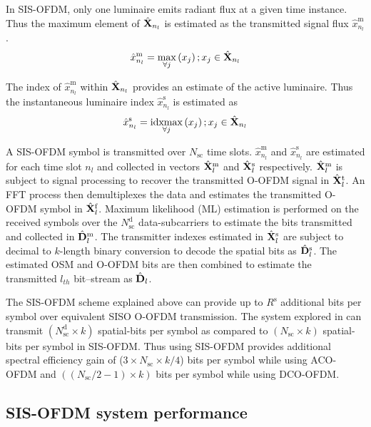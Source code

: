 In SIS-OFDM, only one luminaire emits radiant flux at a given time instance. Thus the maximum element of $\hat{{\bf{X}}}_{n_l}$ is estimated as the transmitted signal flux $\hat{x}^{\text{m}}_{n_l}$.
\begin{equation}
	\label{eqxhsym}
	\hat{x}^{\text{m}}_{n_l} = \max_{\forall j}\left(x_{j}\right); x_{j}\in\hat{{\bf{X}}}_{n_l}
\end{equation}

The index of $\hat{x}^{\text{m}}_{n_l}$ within $\hat{{\bf{X}}}_{n_l}$ provides an estimate of the active luminaire. Thus the instantaneous luminaire index $\hat{x}^{\text{s}}_{n_l}$ is estimated as
\begin{equation}
	\label{eqxhtx}
	\hat{x}^{\text{s}}_{n_l} = \idxmax_{\forall j}\left(x_{j}\right); x_{j}\in\hat{\vm{X}}_{n_l}
\end{equation}

A SIS-OFDM symbol is transmitted over $N_{\text{sc}}$ time slots. $\hat{x}^{\text{m}}_{n_l}$ and $\hat{x}^{\text{s}}_{n_l}$ are estimated for each time slot $n_l$ and collected in vectors $\hat{{\bf{X}}}^{\text{m}}_l$ and $\hat{{\bf{X}}}^{\text{s}}_l$ respectively. $\hat{{\bf{X}}}^{\text{m}}_l$ is subject to signal processing to recover the transmitted O-OFDM signal in $\hat{{\bf{X}}}^{\text{t}}_l$. An FFT process then demultiplexes the data and estimates the transmitted O-OFDM symbol in $\hat{{\bf{X}}}^{\text{f}}_l$. Maximum likelihood (ML) estimation is performed on the received symbols over the $N_{\text{sc}}^{\text{d}}$ data-subcarriers to estimate the bits transmitted and collected in $\hat{{\bf{D}}}^{\text{m}}_l$. The transmitter indexes estimated in $\hat{{\bf{X}}}^{\text{s}}_l$ are subject to decimal to $k$-length binary conversion to decode the spatial bits as $\hat{{\bf{D}}}^{\text{s}}_l$. The estimated OSM and O-OFDM bits are then combined to estimate the transmitted $l_{th}$ bit--stream as $\hat{{\bf{D}}}_l$.

The SIS-OFDM scheme explained above can provide up to $R^{\text{s}}$ additional bits per symbol over equivalent SISO O-OFDM transmission. The system explored in \cite{zha12a} can transmit $(N_{\text{sc}}^{\text{d}}\times k)$ spatial-bits per symbol as compared to $(N_{\text{sc}}\times k)$ spatial-bits per symbol in SIS-OFDM. Thus using SIS-OFDM provides additional spectral efficiency gain of ($3\times N_{\text{sc}}\times k/4$) bits per symbol while using ACO-OFDM and $((N_{\text{sc}}/2 -1)\times k)$ bits per symbol while using DCO-OFDM.

\subsection{SIS-OFDM system performance}
\label{subsec:sisofdmAnalysis}

